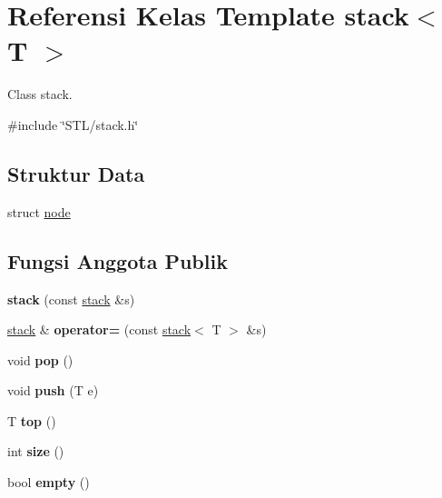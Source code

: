 \hypertarget{classstack}{}\section{Referensi Kelas Template stack$<$ T $>$}
\label{classstack}


Class stack.  




{\ttfamily \#include \char`\"{}S\+T\+L/stack.\+h\char`\"{}}

\subsection*{Struktur Data}
\begin{DoxyCompactItemize}
\item 
struct \hyperlink{structstack_1_1node}{node}
\end{DoxyCompactItemize}
\subsection*{Fungsi Anggota Publik}
\begin{DoxyCompactItemize}
\item 
\hypertarget{classstack_aa2b7837e7fa4708c17c0a78520d18924}{}{\bfseries stack} (const \hyperlink{classstack}{stack} \&s)\label{classstack_aa2b7837e7fa4708c17c0a78520d18924}

\item 
\hypertarget{classstack_a6c35161825c5a23462f4830a047823bc}{}\hyperlink{classstack}{stack} \& {\bfseries operator=} (const \hyperlink{classstack}{stack}$<$ T $>$ \&s)\label{classstack_a6c35161825c5a23462f4830a047823bc}

\item 
\hypertarget{classstack_ad6615a82d944ce2e9a9c260b1d126666}{}void {\bfseries pop} ()\label{classstack_ad6615a82d944ce2e9a9c260b1d126666}

\item 
\hypertarget{classstack_a532ce58222bf37610dbf90c37b42ba98}{}void {\bfseries push} (T e)\label{classstack_a532ce58222bf37610dbf90c37b42ba98}

\item 
\hypertarget{classstack_a6093fd7036685b3d9ea89e96609465ac}{}T {\bfseries top} ()\label{classstack_a6093fd7036685b3d9ea89e96609465ac}

\item 
\hypertarget{classstack_a1577ac10f88c5d6bdbbd9f8f61344b91}{}int {\bfseries size} ()\label{classstack_a1577ac10f88c5d6bdbbd9f8f61344b91}

\item 
\hypertarget{classstack_ab82d4f94c3a83318499848de576feede}{}bool {\bfseries empty} ()\label{classstack_ab82d4f94c3a83318499848de576feede}

\end{DoxyCompactItemize}
